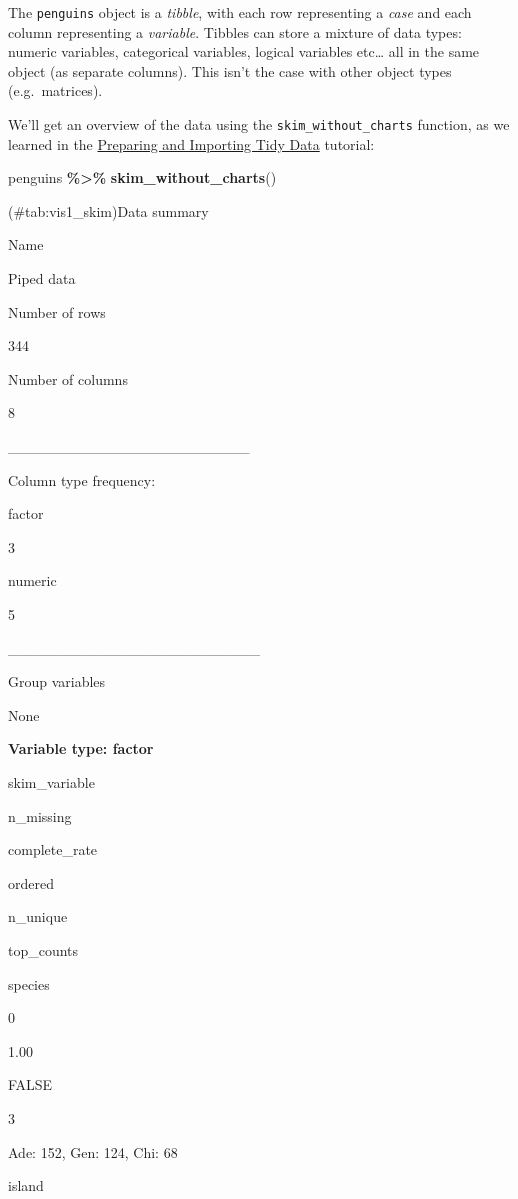 \documentclass[
]{book}
\newenvironment{Shaded}{\begin{snugshade}}{\end{snugshade}}
\newcommand{\FunctionTok}[1]{\textcolor[rgb]{0.13,0.29,0.53}{\textbf{#1}}}
\newcommand{\NormalTok}[1]{#1}
\newcommand{\SpecialCharTok}[1]{\textcolor[rgb]{0.81,0.36,0.00}{\textbf{#1}}}
\begin{document}
The \texttt{penguins} object is a \emph{tibble}, with each row representing a \emph{case} and each column representing a \emph{variable}. Tibbles can store a mixture of data types: numeric variables, categorical variables, logical variables etc\ldots{} all in the same object (as separate columns). This isn't the case with other object types (e.g.~matrices).

We'll get an overview of the data using the \texttt{skim\_without\_charts} function, as we learned in the \hyperref[data_overview]{Preparing and Importing Tidy Data} tutorial:

\begin{Shaded}
\begin{Highlighting}[]
\NormalTok{penguins }\SpecialCharTok{\%\textgreater{}\%}
  \FunctionTok{skim\_without\_charts}\NormalTok{()}
\end{Highlighting}
\end{Shaded}

(\#tab:vis1\_skim)Data summary

Name

Piped data

Number of rows

344

Number of columns

8

\_\_\_\_\_\_\_\_\_\_\_\_\_\_\_\_\_\_\_\_\_\_\_

Column type frequency:

factor

3

numeric

5

\_\_\_\_\_\_\_\_\_\_\_\_\_\_\_\_\_\_\_\_\_\_\_\_

Group variables

None

\textbf{Variable type: factor}

skim\_variable

n\_missing

complete\_rate

ordered

n\_unique

top\_counts

species

0

1.00

FALSE

3

Ade: 152, Gen: 124, Chi: 68

island
\end{document}
